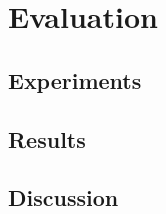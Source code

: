 \chapter{Evaluation}\label{chpt:evaluation}
\glsresetall

\section{Experiments}\label{sec:eval:experiments}

\section{Results}\label{sec:eval:results}

\section{Discussion}\label{sec:eval:discussion}
